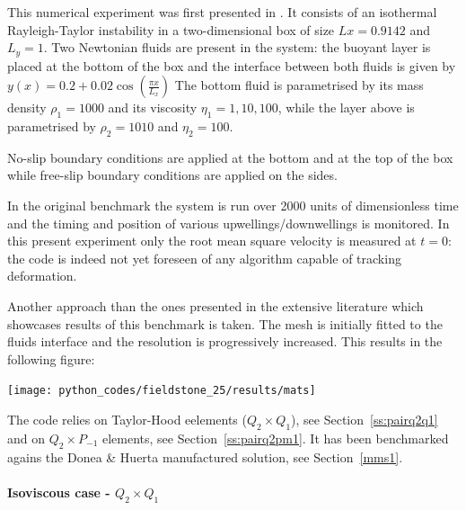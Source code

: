 

This numerical experiment was first presented in \cite{vaks97}.
It consists of an isothermal Rayleigh-Taylor instability in a two-dimensional box
of size $Lx=0.9142$ and $L_y=1$.
Two Newtonian fluids are present in the system: the buoyant layer is placed at the bottom of 
the box and the interface between both fluids is given by 
$
y(x)=0.2+0.02\cos \left( \frac{\pi x}{L_x}  \right)
$
The bottom fluid is parametrised by its mass density $\rho_1=1000$ and its viscosity $\eta_1=1,10,100$, 
while the layer above is parametrised by $\rho_2=1010$ and $\eta_2=100$.

No-slip boundary conditions are applied at the bottom and at the top of the box 
while free-slip boundary conditions are applied on the sides. 

In the original benchmark the system is run over 2000 units of dimensionless time and the 
timing and position of various upwellings/downwellings is monitored. 
In this present experiment only the root mean square velocity is measured at $t=0$:
the code is indeed not yet foreseen of any algorithm capable of tracking deformation.

Another approach than the ones presented in the extensive literature which showcases 
results of this benchmark is taken. The mesh is initially fitted to the fluids
interface and the resolution is progressively increased. This results in the 
following figure:

\begin{center}
\texttt{[image: python\_codes/fieldstone\_25/results/mats]}
\end{center}

The code relies on Taylor-Hood eelements ($Q_2\times Q_1$), see Section~\ref{ss:pairq2q1} and 
on $Q_2\times P_{-1}$ elements, see Section~\ref{ss:pairq2pm1}. 
It has been  benchmarked agains the Donea \& Huerta manufactured solution, see Section~\ref{mms1}.

\newpage
\paragraph{Isoviscous case - $Q_2\times Q_1$}

